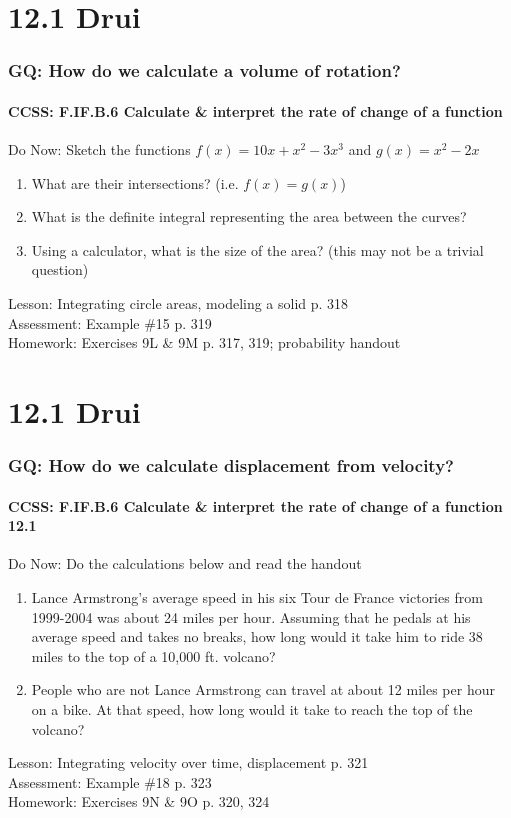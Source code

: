 \documentclass{beamer}
\begin{document}
  \section{12.1 Drui}
  \frame
  {
    \frametitle{GQ: How do we calculate a volume of rotation?}
    \framesubtitle{CCSS: F.IF.B.6 Calculate \& interpret the rate of change of a function}

    \begin{block}{Do Now: Sketch the functions $f(x)=10x+x^2-3x^3$ and $g(x)=x^2-2x$}
    \begin{enumerate}
        \item What are their intersections? (i.e. $f(x)=g(x)$)
        \item What is the definite integral representing the area between the curves?
        \item Using a calculator, what is the size of the area? (this may not be a trivial question)
    \end{enumerate}
    \end{block}
    Lesson: Integrating circle areas, modeling a solid p. 318\\%
    Assessment: Example \#15 p. 319 \\%
    Homework: Exercises 9L \& 9M p. 317, 319; probability handout
  }

  \section{12.1 Drui}
  \frame
  {
    \frametitle{GQ: How do we calculate displacement from velocity?}
    \framesubtitle{CCSS: F.IF.B.6 Calculate \& interpret the rate of change of a function \qquad \alert{12.1}}

    \begin{block}{Do Now: Do the calculations below and read the handout}
    \begin{enumerate}
        \item Lance Armstrong’s average speed in his six Tour de France victories from 1999-2004 was about 24 miles per hour. Assuming that he pedals at his average speed and takes no breaks, how long would it take him to ride 38 miles to the top of a 10,000 ft. volcano?
        \item People who are not Lance Armstrong can travel at about 12 miles per hour on a bike. At that speed, how long would it take to reach the top of the volcano?
    \end{enumerate}
    \end{block}
    Lesson: Integrating velocity over time, displacement p. 321\\%
    Assessment: Example \#18 p. 323 \\%
    Homework: Exercises 9N \& 9O p. 320, 324
  }
\end{document}
